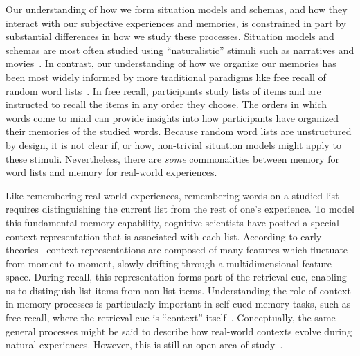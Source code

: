 \documentclass[11pt]{article}
\begin{document}

Our understanding of how we form situation models and schemas, and how they
interact with our subjective experiences and memories, is constrained in part
by substantial differences in how we study these processes. Situation models
and schemas are most often studied using ``naturalistic'' stimuli such as
narratives and movies~\citep{ZwaaEtal95,ZwaaRadv98, NastEtal20}. In contrast,
our understanding of how we organize our memories has been most widely informed
by more traditional paradigms like free recall of random word
lists~\citep{Kaha12, Kaha20}. In free recall, participants study lists of items
and are instructed to recall the items in any order they choose. The orders in
which words come to mind can provide insights into how participants have
organized their memories of the studied words. Because random word lists are
unstructured by design, it is not clear if, or how, non-trivial situation models
might apply to these stimuli. Nevertheless, there are \textit{some}
commonalities between memory for word lists and memory for real-world
experiences.

Like remembering real-world experiences, remembering words on a studied list
requires distinguishing the current list from the rest of one's experience. To
model this fundamental memory capability, cognitive scientists have posited a
special context representation that is associated with each list. According to
early theories~\citep[e.g.][]{Este55a,AndeBowe72} context representations are
composed of many features which fluctuate from moment to moment, slowly
drifting through a multidimensional feature space. During recall, this
representation forms part of the retrieval cue, enabling us to distinguish list
items from non-list items. Understanding the role of context in memory
processes is particularly important in self-cued memory tasks, such as free
recall, where the retrieval cue is ``context'' itself~\citep{HowaKaha02a}.
Conceptually, the same general processes might be said to describe how
real-world contexts evolve during natural experiences. However, this is still
an open area of study~\citep{Mann20, Mann21a}.
\end{document}
